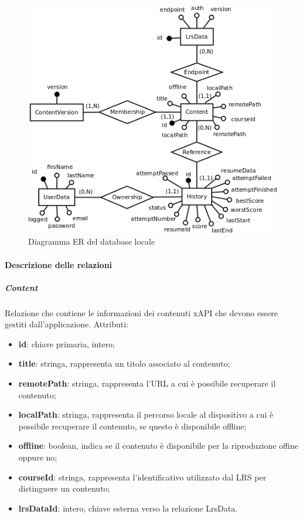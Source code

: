 \documentclass[../Tesi.tex]{subfiles}
\begin{document}
			\begin{figure} [H]
				\centering
				\includegraphics[scale=0.9]{images/er/RealmDB}
					\caption{Diagramma ER del database locale}
			\end{figure}

			\paragraph{Descrizione delle relazioni}
			\subparagraph*{Content}
			Relazione che contiene le informazioni dei contenuti xAPI che devono essere gestiti dall'applicazione. Attributi:
			\begin{itemize}
				\item \textbf{id}: chiave primaria, intero;
				\item \textbf{title}: stringa, rappresenta un titolo associato al contenuto;
				\item \textbf{remotePath}: stringa, rappresenta l'URL a cui è possibile recuperare il contenuto;
				\item \textbf{localPath}: stringa, rappresenta il percorso locale al dispositivo a cui è possibile recuperare il contenuto, se questo è disponibile offline;
				\item \textbf{offline}: boolean, indica se il contenuto è disponibile per la riproduzione offine oppure no;
				\item \textbf{courseId}: stringa, rappresenta l'identificativo utilizzato dal LRS per distinguere un contenuto;
				\item \textbf{lrsDataId}: intero, chiave esterna verso la relazione LrsData.
			\end{itemize}
\end{document}
